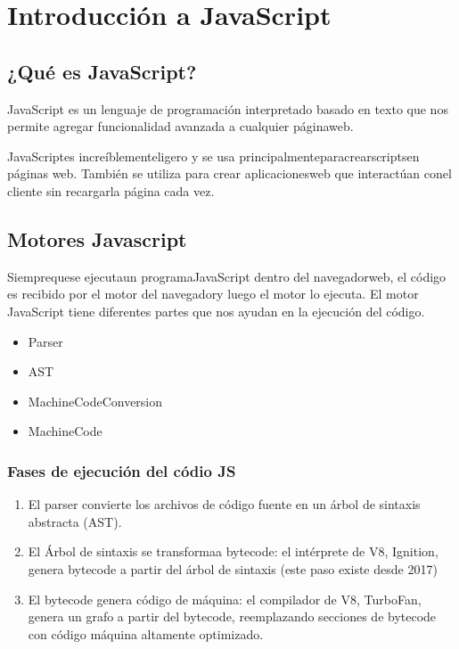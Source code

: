\section{Introducción a JavaScript}


\subsection{¿Qué es JavaScript?}

JavaScript es un lenguaje de programación interpretado basado en texto que nos permite agregar funcionalidad avanzada a cualquier páginaweb.

JavaScriptes increíblementeligero y se usa principalmenteparacrearscriptsen páginas web. También se utiliza para crear aplicacionesweb que interactúan conel cliente sin recargarla página cada vez.

\subsection{Motores Javascript}

Siemprequese ejecutaun programaJavaScript dentro del navegadorweb, el código es recibido por el motor del navegadory luego el motor lo ejecuta.
El motor JavaScript tiene diferentes partes que nos ayudan en la ejecución del código.
\begin{itemize}
    \item Parser
    \item AST
    \item MachineCodeConversion
    \item MachineCode
\end{itemize}
 
\subsubsection*{Fases de ejecución del códio JS}

\begin{enumerate}
    \item El parser convierte los archivos de código fuente en un árbol de sintaxis abstracta (AST).
    \item El Árbol de sintaxis se transformaa bytecode: el intérprete de V8, Ignition, genera bytecode a partir del árbol de sintaxis (este paso existe desde 2017)
    \item El bytecode genera código de máquina: el compilador de V8, TurboFan, genera un grafo a partir del bytecode, reemplazando secciones de bytecode con código máquina altamente optimizado.
\end{enumerate}


